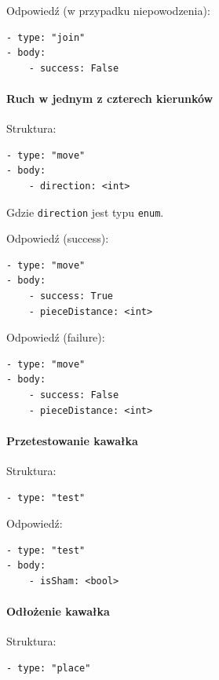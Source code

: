 \documentclass[a4paper]{article}
\newcommand{\code}{\texttt}
\begin{document}
Odpowiedź (w przypadku niepowodzenia):

\begin{verbatim}
- type: "join"
- body:
    - success: False
\end{verbatim}

\paragraph{Ruch w jednym z czterech kierunków}
\hfill

Struktura:

\begin{verbatim}
- type: "move"
- body:
    - direction: <int>
\end{verbatim}

Gdzie \code{direction} jest typu \code{enum}.

Odpowiedź (success):

\begin{verbatim}
- type: "move"
- body:
    - success: True
    - pieceDistance: <int>
\end{verbatim}

Odpowiedź (failure):

\begin{verbatim}
- type: "move"
- body:
    - success: False
    - pieceDistance: <int>
\end{verbatim}

\paragraph{Przetestowanie kawałka}
\hfill

Struktura:

\begin{verbatim}
- type: "test"
\end{verbatim}

Odpowiedź:

\begin{verbatim}
- type: "test"
- body:
    - isSham: <bool>
\end{verbatim}

\paragraph{Odłożenie kawałka}
\hfill

Struktura:

\begin{verbatim}
- type: "place"
\end{verbatim}
\end{document}
